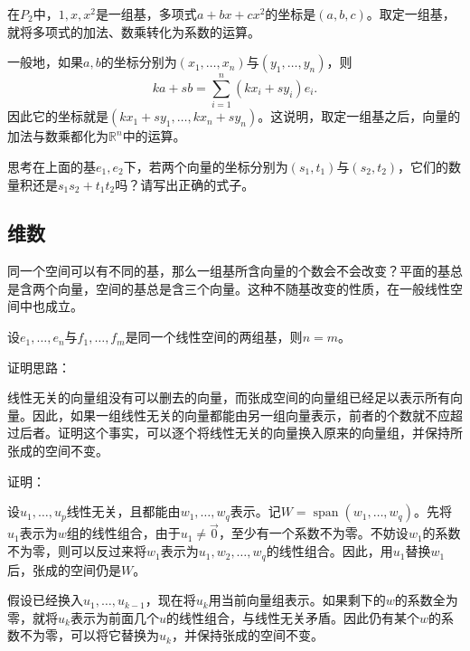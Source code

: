 在\(P_{2}\)中，\(1 , x , x^{2}\)是一组基，多项式\(a + b x + c x^{2}\)的坐标是\(\left( a , b , c \right)\)。取定一组基，就将多项式的加法、数乘转化为系数的运算。

一般地，如果\(a , b\)的坐标分别为\(\left( x_{1} , \ldots , x_{n} \right)\)与\(\left( y_{1} , \ldots , y_{n} \right)\)，则
\begin{equation}
    k a + s b = \sum_{i = 1}^{n} \left( k x_{i} + s y_{i} \right) e_{i} .
\end{equation}
因此它的坐标就是\(\left( k x_{1} + s y_{1} , \ldots , k x_{n} + s y_{n} \right)\)。这说明，取定一组基之后，向量的加法与数乘都化为\(\mathbb{R}^{n}\)中的运算。

{\kaiti{}思考\quad 在上面的基\(e_{1} , e_{2}\)下，若两个向量的坐标分别为\(\left( s_{1} , t_{1} \right)\)与\(\left( s_{2} , t_{2} \right)\)，它们的数量积还是\(s_{1} s_{2} + t_{1} t_{2}\)吗？请写出正确的式子。}

\subsection{维数}
同一个空间可以有不同的基，那么一组基所含向量的个数会不会改变？平面的基总是含两个向量，空间的基总是含三个向量。这种不随基改变的性质，在一般线性空间中也成立。

\begin{theorem}\label{thm:dim}
设\(e_{1} , \ldots , e_{n}\)与\(f_{1} , \ldots , f_{m}\)是同一个线性空间的两组基，则\(n = m\)。
\end{theorem}

{\heiti{}证明思路：}
\nopagebreak[4]

线性无关的向量组没有可以删去的向量，而张成空间的向量组已经足以表示所有向量。因此，如果一组线性无关的向量都能由另一组向量表示，前者的个数就不应超过后者。证明这个事实，可以逐个将线性无关的向量换入原来的向量组，并保持所张成的空间不变。

{\heiti{}证明：}
\nopagebreak[4]

设\(u_{1} , \ldots , u_{p}\)线性无关，且都能由\(w_{1} , \ldots , w_{q}\)表示。记\(W = \operatorname{span}\left( w_{1} , \ldots , w_{q} \right)\)。先将\(u_{1}\)表示为\(w\)组的线性组合，由于\(u_{1} \ne \vec{0}\)，至少有一个系数不为零。不妨设\(w_{1}\)的系数不为零，则可以反过来将\(w_{1}\)表示为\(u_{1} , w_{2} , \ldots , w_{q}\)的线性组合。因此，用\(u_{1}\)替换\(w_{1}\)后，张成的空间仍是\(W\)。

假设已经换入\(u_{1} , \ldots , u_{k - 1}\)，现在将\(u_{k}\)用当前向量组表示。如果剩下的\(w\)的系数全为零，就将\(u_{k}\)表示为前面几个\(u\)的线性组合，与线性无关矛盾。因此仍有某个\(w\)的系数不为零，可以将它替换为\(u_{k}\)，并保持张成的空间不变。


